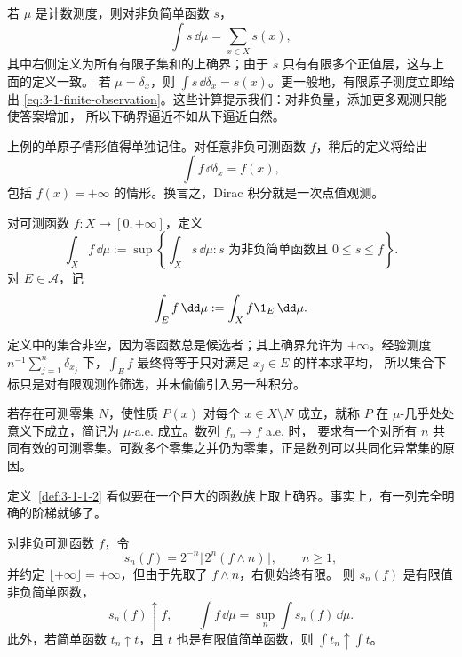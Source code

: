 \begin{example}[三个有限观测模型]\label{ex:3-1-1-1}
若 $\mu$ 是计数测度，则对非负简单函数 $s$，
\[
 \int s\,\dd\mu=\sum_{x\in X}s(x),
\]
其中右侧定义为所有有限子集和的上确界；由于 $s$ 只有有限多个正值层，这与上面的定义一致。
若 $\mu=\delta_x$，则 $\int s\,\dd\delta_x=s(x)$。更一般地，有限原子测度立即给出
\eqref{eq:3-1-finite-observation}。这些计算提示我们：对非负量，添加更多观测只能使答案增加，
所以下确界逼近不如从下逼近自然。
\end{example}

\begin{example}[Dirac 测度]\label{ex:3-1-1-2}
上例的单原子情形值得单独记住。对任意非负可测函数 $f$，稍后的定义将给出
\[
 \int f\,\dd\delta_x=f(x),
\]
包括 $f(x)=+\infty$ 的情形。换言之，Dirac 积分就是一次点值观测。
\end{example}

\begin{definition}[非负积分]\label{def:3-1-1-2}
对可测函数 $f:X\to[0,+\infty]$，定义
\[
 \int_X f\,\dd\mu
 :=\sup\left\{\int_Xs\,\dd\mu:
      s\text{ 为非负简单函数且 }0\leq s\leq f\right\}.
 \tag{3.1.2}\label{eq:3-1-positive-integral}
\]
对 $E\in\mathcal A$，记
\[
 \int_Ef\,\dd\mu:=\int_Xf\1_E\,\dd\mu.
\]
\end{definition}

定义中的集合非空，因为零函数总是候选者；其上确界允许为 $+\infty$。经验测度
$n^{-1}\sum_{j=1}^n\delta_{x_j}$ 下，$\int_Ef$ 最终将等于只对满足 $x_j\in E$ 的样本求平均，
所以集合下标只是对有限观测作筛选，并未偷偷引入另一种积分。

\begin{definition}[几乎处处与共同零集]\label{def:3-1-1-ae}
若存在可测零集 $N$，使性质 $P(x)$ 对每个 $x\in X\setminus N$ 成立，就称 $P$ 在
$\mu$-几乎处处意义下成立，简记为 $\mu$-a.e. 成立。数列 $f_n\to f$ a.e. 时，
要求有一个对所有 $n$ 共同有效的可测零集。可数多个零集之并仍为零集，正是数列可以共同化异常集的原因。
\end{definition}

定义~\ref{def:3-1-1-2} 看似要在一个巨大的函数族上取上确界。事实上，有一列完全明确的阶梯就够了。

\begin{lemma}[规范层级逼近]\label{lemma:3-1-1-layer}
对非负可测函数 $f$，令
\[
 s_n(f)=2^{-n}\bigl\lfloor 2^n(f\wedge n)\bigr\rfloor,
 \qquad n\geq1,
 \tag{3.1.3}\label{eq:3-1-canonical-simple}
\]
并约定 $\lfloor+\infty\rfloor=+\infty$，但由于先取了 $f\wedge n$，右侧始终有限。
则 $s_n(f)$ 是有限值非负简单函数，
\[
  s_n(f)\uparrow f,
  \qquad
  \int f\,\dd\mu=\sup_n\int s_n(f)\,\dd\mu.
  \tag{3.1.4}\label{eq:3-1-canonical-sup}
\]
此外，若简单函数 $t_n\uparrow t$，且 $t$ 也是有限值简单函数，则
$\int t_n\uparrow\int t$。
\end{lemma}

